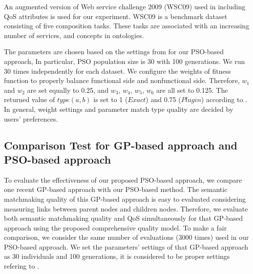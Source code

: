 \documentclass{llncs}
\begin{document}
An augmented version of Web service challenge 2009 (WSC09) used in \cite{ma2015hybrid,da2016genetic} including QoS attributes is used for our experiment. WSC09 is a benchmark dataset consisting of five composition tasks. These tasks are associated with an increasing number of services, and concepts in ontologies. 

The parameters are chosen based on the settings from \cite{shi2001particle} for our PSO-based approach, In particular, PSO population size is 30 with 100 generations. We run 30 times independently for each dataset. We configure the weights of fitness function to properly balance functional side and nonfunctional side. Therefore, $w_{1}$ and $w_{2}$ are set equally to 0.25, and $w_{3}$, $w_{4}$, $w_{5}$, $w_{6}$ are all set to 0.125. The returned value of $type(a,b)$ is set to 1 ($Exact$) and 0.75 ($Plugin$) according to \cite{lecue2009optimizing}. In general, weight settings and parameter match type quality are decided by users' preferences.

\subsection{Comparison Test for GP-based approach and PSO-based approach}\label{comparisonTestWithGP}
To evaluate the effectiveness of our proposed PSO-based approach, we compare one recent GP-based approach \cite{ma2015hybrid} with our PSO-based method. The semantic matchmaking quality of this GP-based approach is easy to evaluated considering measuring links between parent nodes and children nodes. Therefore, we evaluate both semantic matchmaking quality and QoS simultaneously for that GP-based approach using the proposed comprehensive quality model. To make a fair comparison, we consider the same number of evaluations (3000 times) used in our PSO-based approach. We set the parameters' settings of that GP-based approach as 30 individuals and 100 generations, it is considered to be proper settings refering to \cite{da2015gp}.
\end{document}
